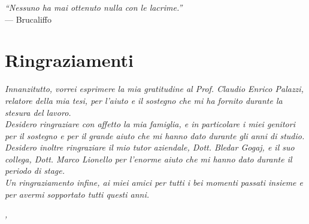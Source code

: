 
\cleardoublepage
{}
{}

\begin{flushright}{
	\slshape    
	``Nessuno ha mai ottenuto nulla con le lacrime.''} \\ 
	\medskip
    --- Brucaliffo
\end{flushright}


\bigskip

\begingroup
\let\clearpage\relax
\let\cleardoublepage\relax
\let\cleardoublepage\relax

\chapter*{Ringraziamenti}

\noindent \textit{Innanzitutto, vorrei esprimere la mia gratitudine al Prof. Claudio Enrico Palazzi, relatore della mia tesi, per l'aiuto e il sostegno che mi ha fornito durante la stesura del lavoro.}\\

\noindent \textit{Desidero ringraziare con affetto la mia famiglia, e in particolare i miei genitori per il sostegno e per il grande aiuto che mi hanno dato durante gli anni di studio.}\\

\noindent \textit{Desidero inoltre ringraziare il mio tutor aziendale, Dott. Bledar Gogaj, e il suo collega, Dott. Marco Lionello per l'enorme aiuto che mi hanno dato durante il periodo di stage.}\\

\noindent \textit{Un ringraziamento infine, ai miei amici per tutti i bei momenti passati insieme e per avermi sopportato tutti questi anni.}\\
\bigskip

\noindent\textit{\myLocation, \myTime}
\hfill \myName

\endgroup

